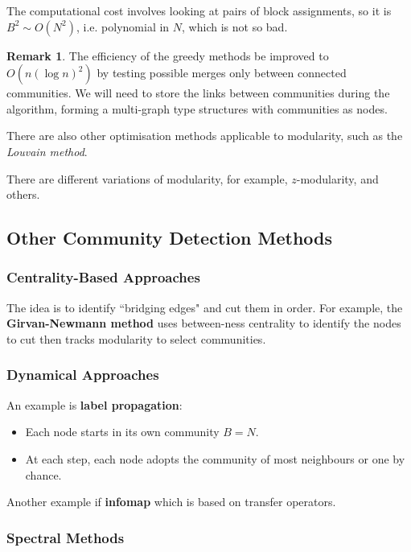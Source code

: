 \documentclass[12pt]{article}
\theoremstyle{definition}
\newtheorem{remark}{Remark}[section]
\begin{document}
The computational cost involves looking at pairs of block assignments, so it is $B^2\sim O(N^2)$, i.e. polynomial in $N$, which is not so bad.

\begin{remark}
    The efficiency of the greedy methods be improved to $O(n(\log n)^2)$ by testing possible merges only between connected communities. We will need to store the links between communities during the algorithm, forming a multi-graph type structures with communities as nodes.

    There are also other optimisation methods applicable to modularity, such as the \textit{Louvain method}.

    There are different variations of modularity, for example, $z$-modularity, and others.  
\end{remark}

\subsection{Other Community Detection Methods}

\subsubsection{Centrality-Based Approaches}

The idea is to identify ``bridging edges" and cut them in order. For example, the \textbf{Girvan-Newmann method} uses between-ness centrality to identify the nodes to cut then tracks modularity to select communities. 

\subsubsection{Dynamical Approaches}

An example is \textbf{label propagation}: 
\begin{itemize}
    \item Each node starts in its own community $B=N$. 
    \item At each step, each node adopts the community of most neighbours or one by chance. 
\end{itemize}

Another example if \textbf{infomap} which is based on transfer operators. 

\subsubsection{Spectral Methods}
\end{document}
